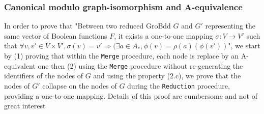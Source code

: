 \documentclass[a4paper,10pt]{article}
\begin{document}
\subsubsection{Canonical modulo graph-isomorphism and A-equivalence}
In order to prove that "Between two reduced GroBdd $G$ and $G'$ representing the same vector of Boolean functions $F$, it exists a one-to-one mapping $\sigma : V \longrightarrow V'$ such that $\forall v, v' \in V \times V', \sigma(v) = v' \Rightarrow (\exists a \in A_{*}, \phi(v) = \rho(a)(\phi(v'))$", we start by (1) proving that within the \texttt{Merge} procedure, each node is replace by an A-equivalent one then (2) using the \texttt{Merge} procedure without re-generating the identifiers of the nodes of $G$ and using the property (2.c), we prove that the nodes of $G'$ collapse on the nodes of $G$ during the \texttt{Reduction} procedure, providing a one-to-one mapping.
Details of this proof are cumbersome and not of great interest
\end{document}
